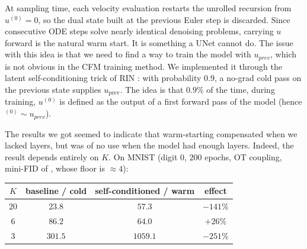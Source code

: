 \documentclass[a4paper,11pt]{article}
\theoremstyle{plain}{\theorembodyfont{\rmfamily}%
\newtheorem{proposition}[theorem]{Proposition}}
\theoremstyle{plain}{\theorembodyfont{\rmfamily}%
\newtheorem{notation}[theorem]{Notation}}
\theoremstyle{plain}{\theorembodyfont{\rmfamily}%
\newtheorem{assumption}[theorem]{Assumption}}
\theoremstyle{plain}{\theorembodyfont{\rmfamily}%
\newtheorem{problem}[theorem]{Problem}}
\theoremstyle{plain}{\theorembodyfont{\rmfamily}%
\newtheorem{example}[theorem]{Example}}
\theoremstyle{plain}{\theorembodyfont{\rmfamily}%
\newtheorem{remark}[theorem]{Remark}}
\theoremstyle{plain}{\theorembodyfont{\rmfamily}%
\newtheorem{definition}[theorem]{Definition}}
\theoremstyle{plain}{\theorembodyfont{\rmfamily}%
\newtheorem{question}[theorem]{Question}}
\numberwithin{equation}{section}
\begin{document}
At sampling time, each velocity evaluation restarts the unrolled recursion from
$u^{(0)}=0$, so the dual state built at the previous Euler step is discarded. Since
consecutive ODE steps solve nearly identical denoising problems, carrying $u$
forward is the natural warm start. It is something a UNet cannot do. The issue with this idea is that we need to find a way to train the model with $u_{prev}$, which is not obvious in the CFM training method. We implemented it through the latent self-conditioning trick of RIN \cite{jabri2023rin}: with probability $0.9$, a no-grad cold pass on the previous
state supplies $u_{\text{prev}}$. The idea is that $0.9$\% of the time, during training, $u^{(0)}$ is defined as the output of a first forward pass of the model (hence $^{(0)} \sim u_{prev}$).

The results we got seemed to indicate that warm-starting compensated when we lacked layers, but was of no use when the model had enough layers. Indeed, the result depends entirely on $K$. On MNIST (digit $0$, $200$
epochs, OT coupling, mini-FID of , whose floor is
$\approx 4$):

\begin{center}
\small
\begin{tabular}{cccc}
\toprule
$K$ & baseline / cold & self-conditioned / warm & effect \\
\midrule
$20$ & $23.8$  & $57.3$   & $-141\%$ \\
$6$  & $86.2$  & $64.0$   & $+26\%$ \\
$3$  & $301.5$ & $1059.1$ & $-251\%$ \\
\bottomrule
\end{tabular}
\end{center}
\end{document}
